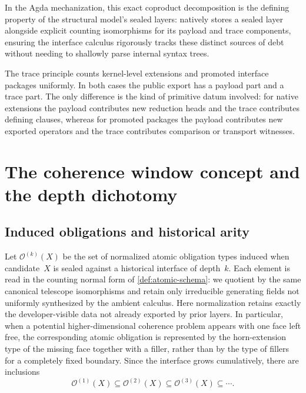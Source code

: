 \documentclass{lmcs}
\newcommand{\Ocal}{\mathcal{O}}
\begin{document}
\begin{rem}
In the Agda mechanization, this exact coproduct decomposition is the defining property of the structural model's sealed layers:  natively stores a sealed layer alongside explicit counting isomorphisms for its payload and trace components, ensuring the interface calculus rigorously tracks these distinct sources of debt without needing to shallowly parse internal syntax trees.
\end{rem}

\begin{rem}
\label{rem:trace-native-vs-api}
The trace principle counts kernel-level extensions and promoted interface packages uniformly. In both cases the public export has a payload part and a trace part. The only difference is the kind of primitive datum involved: for native extensions the payload contributes new reduction heads and the trace contributes defining clauses, whereas for promoted packages the payload contributes new exported operators and the trace contributes comparison or transport witnesses.
\end{rem}

\section{The coherence window concept and the depth dichotomy}
\label{sec:coherence}

\subsection{Induced obligations and historical arity}

\begin{defi}
\label{def:obligations}
Let $\Ocal^{(k)}(X)$ be the set of normalized atomic obligation types induced when candidate~$X$ is sealed against a historical interface of depth~$k$. Each element is read in the counting normal form of \autoref{def:atomic-schema}: we quotient by the same canonical telescope isomorphisms and retain only irreducible generating fields not uniformly synthesized by the ambient calculus. Here normalization retains exactly the developer-visible data not already exported by prior layers. In particular, when a potential higher-dimensional coherence problem appears with one face left free, the corresponding atomic obligation is represented by the horn-extension type of the missing face together with a filler, rather than by the type of fillers for a completely fixed boundary. Since the interface grows cumulatively, there are inclusions
\[
  \Ocal^{(1)}(X) \subseteq \Ocal^{(2)}(X) \subseteq \Ocal^{(3)}(X) \subseteq \cdots.
\]
\end{defi}
\end{document}
